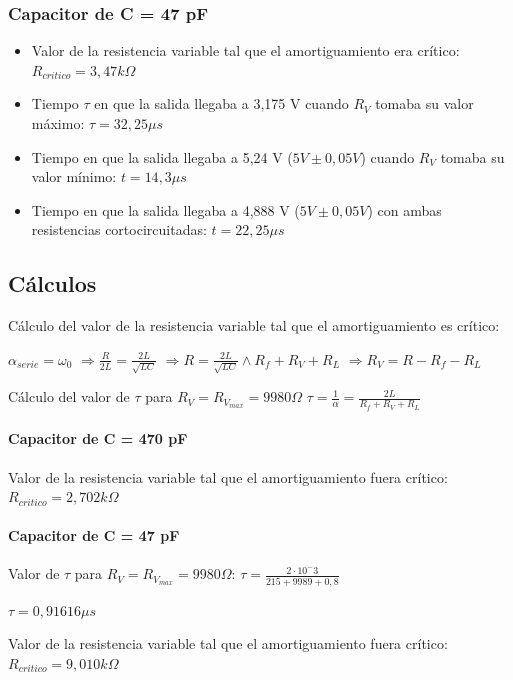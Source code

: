 \documentclass{article}
\begin{document}
        \subsubsection*{Capacitor de C = 47 pF}
            \begin{itemize}
                \item Valor de la resistencia variable tal que el amortiguamiento era crítico: $ R_{critico} = 3,47 k\Omega $
                \item Tiempo $\tau$ en que la salida llegaba a 3,175 V cuando $ R_V $ tomaba su valor máximo: $ \tau = 32,25 \mu s$
                \item Tiempo en que la salida llegaba a 5,24 V ($ 5V \pm 0,05V $) cuando $ R_V $ tomaba su valor mínimo:  $ t = 14,3 \mu s$ %
                \item Tiempo en que la salida llegaba a 4,888 V ($ 5V \pm 0,05V $) con ambas resistencias cortocircuitadas: $ t = 22,25 \mu s$
            \end{itemize}

    \subsection{Cálculos}

        Cálculo del valor de la resistencia variable tal que el amortiguamiento es crítico: \par
        $ \alpha_{serie} = \omega_0 $
        $ \Rightarrow \frac{R}{2L} = \frac{2L}{\sqrt{LC}} $
        $ \Rightarrow R = \frac{2L}{\sqrt{LC}}  \wedge R_f + R_V + R_L $
        $ \Rightarrow R_V = R - R_f  -R_L $

        Cálculo del valor de $ \tau $ para $ R_V = R_{V_{max}} = 9980 \Omega $
        $ \tau = \frac{1}{\alpha} = \frac{2L}{R_f + R_V + R_L} $

            \paragraph*{Capacitor de C = 470 pF} 
                \par Valor de la resistencia variable tal que el amortiguamiento fuera crítico: $ R_{critico} = 2,702 k\Omega $ %

            \paragraph*{Capacitor de C = 47 pF} 
                Valor de $ \tau $ para $ R_V = R_{V_{max} }= 9980 \Omega $: $ \tau = \frac{2 \cdot 10^-3}{215 + 9989 + 0,8} $ \par
                $ \tau = 0,91616 \mu s $
                \par Valor de la resistencia variable tal que el amortiguamiento fuera crítico: $ R_{critico} = 9,010 k\Omega $
        
\end{document}
